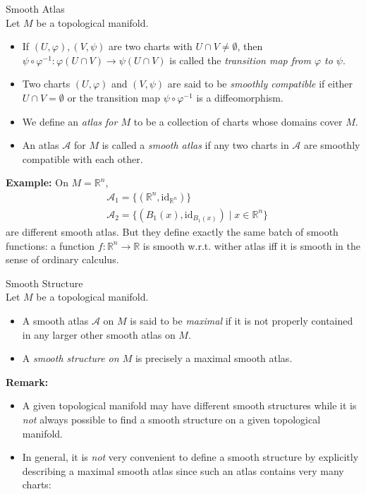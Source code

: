 \begin{definition}{Smooth Atlas}\\
Let $M$ be a topological manifold.
\begin{itemize}
    \item If $(U,\varphi), (V,\psi)$ are two charts with $U\cap V\neq \emptyset$, then $\psi \circ \varphi^{-1}: \varphi(U\cap V) \to \psi (U\cap V)$ is called the \textit{transition map from $\varphi$ to $\psi$}.

    \item Two charts $(U,\varphi)$ and $(V,\psi)$ are said to be \textit{smoothly compatible} if either $U \cap V=\emptyset$ or the transition map $\psi\circ \varphi^{-1}$ is a diffeomorphism.

    \item We define an \textit{atlas for $M$} to be a collection of charts whose domains cover $M$.

    \item An atlas $\mathcal{A}$ for $M$ is called a \textit{smooth atlas} if any two charts in $\mathcal{A}$ are smoothly compatible with each other.
\end{itemize}
\end{definition}

\noindent\textbf{Example:} On $M=\mathbb{R}^n$,
\begin{align*}
    &\mathcal{A}_1= \{(\mathbb{R}^n, \text{id}_{\mathbb{R}^n}) \}\\
    &\mathcal{A}_2= \{(B_1(x),\text{id}_{B_1(x)}) \mid x\in \mathbb{R}^n\}
\end{align*}
are different smooth atlas. But they define exactly the same batch of smooth functions: a function $f: \mathbb{R}^n \to \mathbb{R}$ is smooth w.r.t. wither atlas iff it is smooth in the sense of ordinary calculus.

\begin{definition}{Smooth Structure}\\
Let $M$ be a topological manifold. 
\begin{itemize}
    \item A smooth atlas $\mathcal{A}$ on $M$ is said to be \textit{maximal} if it is not properly contained in any larger other smooth atlas on $M$.
    \item A \textit{smooth structure on $M$} is precisely a maximal smooth atlas.
\end{itemize}
\end{definition}

\noindent\textbf{Remark:} \begin{itemize}
    \item A given topological manifold may have different smooth structures while it is \textit{not} always possible to find a smooth structure on a given topological manifold.

    \item In general, it is \textit{not} very convenient to define a smooth structure by explicitly describing a maximal smooth atlas since such an atlas contains very many charts:
\end{itemize}

